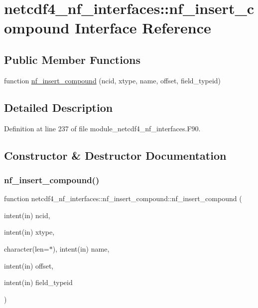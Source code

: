 \hypertarget{interfacenetcdf4__nf__interfaces_1_1nf__insert__compound}{}\section{netcdf4\+\_\+nf\+\_\+interfaces\+:\+:nf\+\_\+insert\+\_\+compound Interface Reference}
\label{interfacenetcdf4__nf__interfaces_1_1nf__insert__compound}
\subsection*{Public Member Functions}
\begin{DoxyCompactItemize}
\item 
function \hyperlink{interfacenetcdf4__nf__interfaces_1_1nf__insert__compound_a024fe73d0198e08d15f4c9502b1bcfda}{nf\+\_\+insert\+\_\+compound} (ncid, xtype, name, offset, field\+\_\+typeid)
\end{DoxyCompactItemize}


\subsection{Detailed Description}


Definition at line 237 of file module\+\_\+netcdf4\+\_\+nf\+\_\+interfaces.\+F90.



\subsection{Constructor \& Destructor Documentation}
\mbox{\label{interfacenetcdf4__nf__interfaces_1_1nf__insert__compound_a024fe73d0198e08d15f4c9502b1bcfda}} 
\subsubsection{\texorpdfstring{nf\+\_\+insert\+\_\+compound()}{nf\_insert\_compound()}}
{\footnotesize\ttfamily function netcdf4\+\_\+nf\+\_\+interfaces\+::nf\+\_\+insert\+\_\+compound\+::nf\+\_\+insert\+\_\+compound (\begin{DoxyParamCaption}\item[{intent(in)}]{ncid,  }\item[{intent(in)}]{xtype,  }\item[{character(len=$\ast$), intent(in)}]{name,  }\item[{intent(in)}]{offset,  }\item[{intent(in)}]{field\+\_\+typeid }\end{DoxyParamCaption})}



